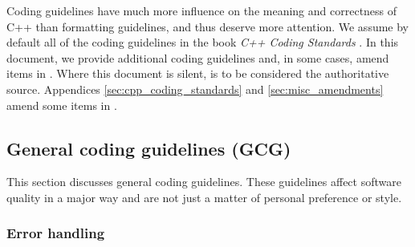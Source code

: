 Coding guidelines have much more influence on the meaning and
correctness of C++ than formatting guidelines, and thus deserve more
attention.  We assume by default all of the coding guidelines in the
book \emph{C++ Coding Standards} \cite{C++CodingStandards05}.  In this
document, we provide additional coding guidelines and, in some cases,
amend items in {}\cite{C++CodingStandards05}.  Where this document is
silent, {}\cite{C++CodingStandards05} is to be considered the
authoritative source.  Appendices \ref{sec:cpp_coding_standards} and
\ref{sec:misc_amendments} amend some items in
\cite{C++CodingStandards05}.

%
\subsection{General coding guidelines (GCG)}
%

This section discusses general coding guidelines.  These guidelines
affect software quality in a major way and are not just a matter of
personal preference or style.

%
\subsubsection{Error handling}
%

